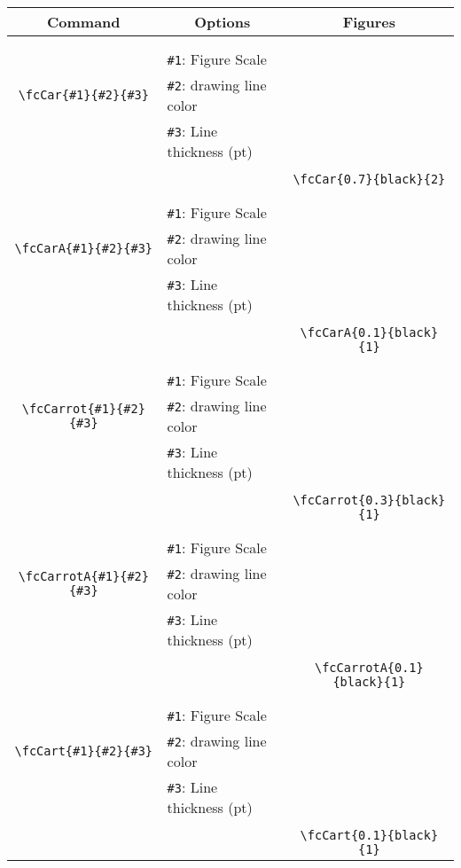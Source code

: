\documentclass[x11names]{article}
\begin{document}
\begin{table}[H]\centering\begin{tabular}{|c|l|c|}\hline {\bf Command}& \multicolumn{1}{c|}{{\bf Options}} & {\bf Figures}\\  \hline	&&\multirow{5}{*}{\fcCar{0.7}{black}{2}}\\	&&\\	&\verb|#1|: Figure Scale &\\	\verb|\fcCar{#1}{#2}{#3}|&	\verb|#2|: drawing line color &\\	&\verb|#3|: Line thickness (pt) &\\ &&\\&&	\verb|\fcCar{0.7}{black}{2}|\\\hline 	
	&&\multirow{5}{*}{\fcCarA{0.1}{black}{1}}\\	&&\\	&\verb|#1|: Figure Scale &\\	\verb|\fcCarA{#1}{#2}{#3}|&	\verb|#2|: drawing line color &\\	&\verb|#3|: Line thickness (pt) &\\ &&\\&&	\verb|\fcCarA{0.1}{black}{1}|\\\hline 	
	&&\multirow{5}{*}{\fcCarrot{0.3}{black}{1}}\\	&&\\	&\verb|#1|: Figure Scale &\\	\verb|\fcCarrot{#1}{#2}{#3}|&	\verb|#2|: drawing line color &\\	&\verb|#3|: Line thickness (pt) &\\ &&\\&&	\verb|\fcCarrot{0.3}{black}{1}|\\\hline 	
	&&\multirow{5}{*}{\fcCarrotA{0.1}{black}{1}}\\	&&\\	&\verb|#1|: Figure Scale &\\	\verb|\fcCarrotA{#1}{#2}{#3}|&	\verb|#2|: drawing line color &\\	&\verb|#3|: Line thickness (pt) &\\ &&\\&&	\verb|\fcCarrotA{0.1}{black}{1}|\\\hline 	
	&&\multirow{5}{*}{\fcCart{0.1}{black}{1}}\\	&&\\	&\verb|#1|: Figure Scale &\\	\verb|\fcCart{#1}{#2}{#3}|&	\verb|#2|: drawing line color &\\	&\verb|#3|: Line thickness (pt) &\\ &&\\&&	\verb|\fcCart{0.1}{black}{1}|\\\hline 	

\end{tabular}
\end{table}
\end{document}
